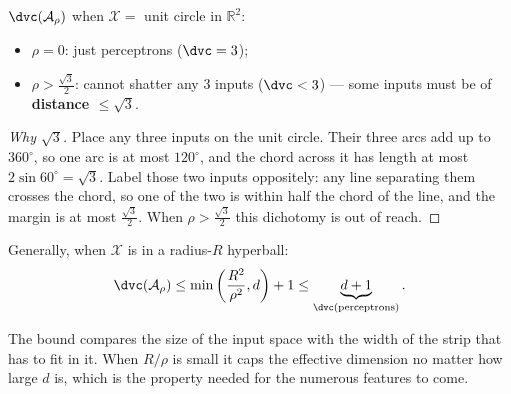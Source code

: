 \begin{center}
    \begin{minipage}[c]{0.66\textwidth}
        \(\dvc(\mathcal{A}_\rho)\) when \(\mathcal{X} =\) unit circle in
        \(\mathbb{R}^2\):
        \begin{itemize}
            \item \(\rho = 0\): just perceptrons (\(\dvc = 3\));
            \item \(\rho > \frac{\sqrt{3}}{2}\): cannot shatter any 3 inputs
                (\(\dvc < 3\)) --- some inputs must be of \textbf{distance
                \(\le \sqrt{3}\)}.
        \end{itemize}
    \end{minipage}%
    \hfill
    \begin{minipage}[c]{0.3\textwidth}
        \centering
    \end{minipage}
\end{center}

\begin{proof}[Why \(\sqrt{3}\)]
    Place any three inputs on the unit circle. Their three arcs add up to
    \(360^\circ\), so one arc is at most \(120^\circ\), and the chord across
    it has length at most \(2 \sin 60^\circ = \sqrt{3}\). Label those two
    inputs oppositely: any line separating them crosses the chord, so one of
    the two is within half the chord of the line, and the margin is at most
    \(\frac{\sqrt{3}}{2}\). When \(\rho > \frac{\sqrt{3}}{2}\) this dichotomy
    is out of reach.
\end{proof}

\begin{moral}
    Generally, when \(\mathcal{X}\) is in a radius-\(R\) hyperball:
    \[
        \dvc(\mathcal{A}_\rho) \le \min \left( \frac{R^2}{\rho^2}, d \right)
        + 1 \le \underbrace{d + 1}_{\dvc(\text{perceptrons})}.
    \]
\end{moral}

The bound compares the size of the input space with the width of the strip
that has to fit in it. When \(R/\rho\) is small it caps the effective
dimension no matter how large \(d\) is, which is the property needed for
the numerous features to come.

